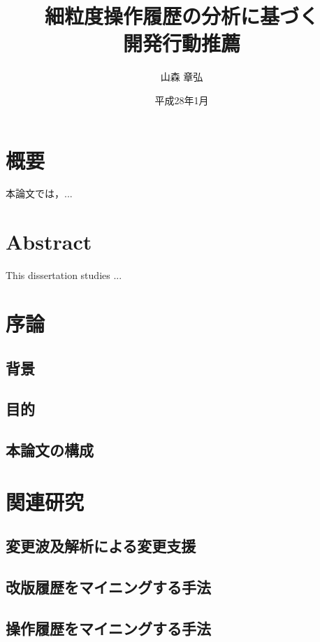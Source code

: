 \documentclass[a4paper]{jsbook}
\title{細粒度操作履歴の分析に基づく\\開発行動推薦}
\author{山森 章弘}
\date{平成28年1月}
\affiliation{大学院情報理工学研究科 計算工学専攻}
\begin{document}
\frontmatter
\maketitle

\chapter*{概要}
本論文では，...

\chapter*{Abstract}
This dissertation studies ...

\tableofcontents
\listoffigures
\listoftables

\mainmatter

\chapter{序論}
\section{背景}
\section{目的}
\section{本論文の構成}
\chapter{関連研究}
\section{変更波及解析による変更支援}
\section{改版履歴をマイニングする手法}
\section{操作履歴をマイニングする手法}
\end{document}
